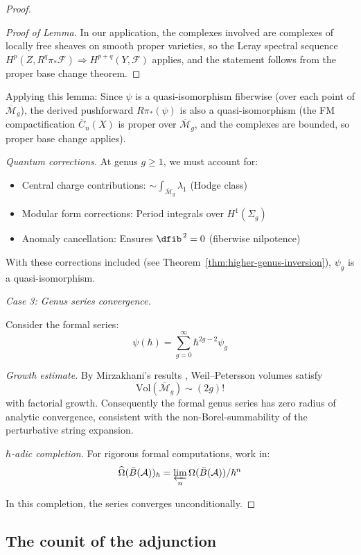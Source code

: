 \begin{proof}
\begin{proof}[Proof of Lemma]
In our application, the complexes involved are complexes of locally free sheaves on smooth proper varieties, so the Leray spectral sequence $H^p(Z, R^q\pi_*\mathcal{F}) \Rightarrow H^{p+q}(Y, \mathcal{F})$ applies, and the statement follows from the proper base change theorem.
\end{proof}

Applying this lemma: Since $\psi$ is a quasi-isomorphism fiberwise (over each
point of $\overline{\mathcal{M}}_g$), the derived pushforward $R\pi_*(\psi)$ is also a quasi-isomorphism (the FM compactification $\overline{C}_n(X)$ is proper over $\overline{\mathcal{M}}_g$, and the complexes are bounded, so proper base change applies).

\emph{Quantum corrections.} At genus $g \geq 1$, we must account for:
\begin{itemize}
\item Central charge contributions: $\sim \int_{\overline{\mathcal{M}}_g} \lambda_1$ 
      (Hodge class)
\item Modular form corrections: Period integrals over $H^1(\Sigma_g)$
\item Anomaly cancellation: Ensures $\dfib^{\,2} = 0$ (fiberwise nilpotence)
\end{itemize}

With these corrections included (see Theorem~\ref{thm:higher-genus-inversion}), 
$\psi_g$ is a quasi-isomorphism.

\emph{Case 3: Genus series convergence.}

Consider the formal series:
\[\psi(\hbar) = \sum_{g=0}^\infty \hbar^{2g-2} \psi_g\]

\emph{Growth estimate.} By Mirzakhani's results \cite{Mirzakhani}, Weil--Petersson volumes satisfy
\[\mathrm{Vol}(\overline{\mathcal{M}}_g) \sim (2g)!\]
with factorial growth.  Consequently the formal genus series has zero radius of analytic convergence, consistent with the non-Borel-summability of the perturbative string expansion.

\emph{$\hbar$-adic completion.} For rigorous formal computations, work in:
\[\widehat{\Omega}(\bar{B}(\mathcal{A}))_\hbar = \varprojlim_n 
\Omega(\bar{B}(\mathcal{A})) / \hbar^n\]

In this completion, the series converges unconditionally.
\end{proof}

\subsection{The counit of the adjunction}

